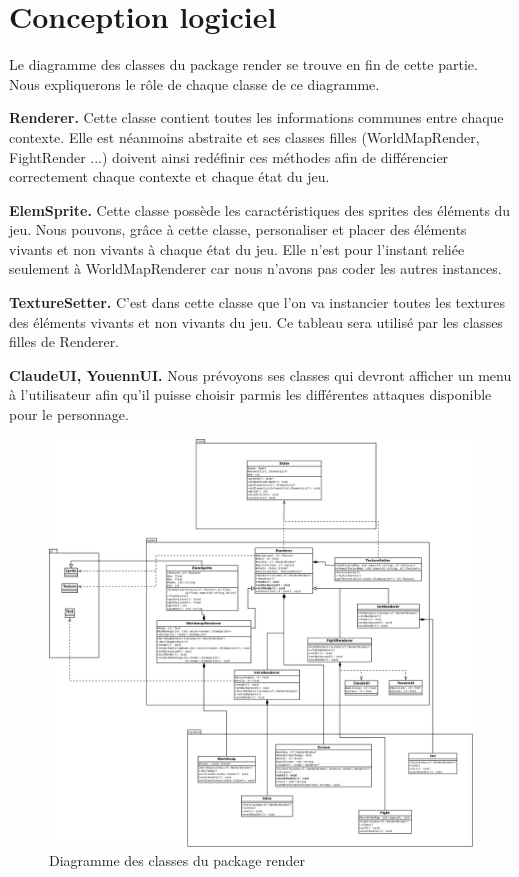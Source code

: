 \documentclass[12pt,a4paper]{report}
\begin{document}
\section{Conception logiciel}
Le diagramme des classes du package render se trouve en fin de cette partie. Nous expliquerons le r\^{o}le de chaque classe de ce diagramme.

\textbf{Renderer.} Cette classe contient toutes les informations communes entre chaque contexte. Elle est néanmoins abstraite et ses classes filles (WorldMapRender, FightRender ...) doivent ainsi red\'{e}finir ces m\'{e}thodes afin de diff\'{e}rencier correctement chaque contexte et chaque \'{e}tat du jeu.

\textbf{ElemSprite.} Cette classe poss\`{e}de les caract\'{e}ristiques des sprites des \'{e}l\'{e}ments du jeu. Nous pouvons, gr\^{a}ce \`{a} cette classe, personaliser et placer des \'{e}l\'{e}ments vivants et non vivants \`{a} chaque \'{e}tat du jeu. Elle n'est pour l'instant reli\'{e}e seulement \`{a} WorldMapRenderer car nous n'avons pas coder les autres instances.

\textbf{TextureSetter.} C'est dans cette classe que l'on va instancier toutes les textures des \'{e}l\'{e}ments vivants et non vivants du jeu. Ce tableau sera utilis\'{e} par les classes filles de Renderer.

\textbf{ClaudeUI, YouennUI.} Nous pr\'{e}voyons ses classes qui devront afficher un menu \`{a} l'utilisateur afin qu'il puisse choisir parmis les diff\'{e}rentes attaques disponible pour le personnage. 

\begin{figure}
\caption{Diagramme des classes du package render}
\includegraphics[width=1\textwidth]{render.jpeg}
\end{figure}
 
\end{document}

